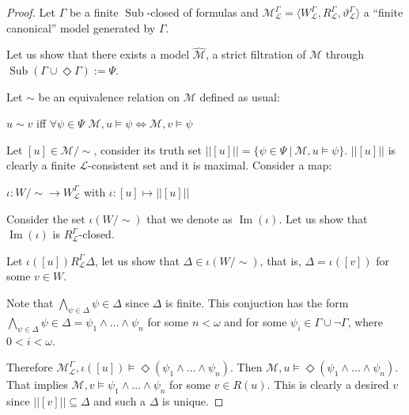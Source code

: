 \documentclass[a4paper]{article}
\theoremstyle{defin}
\theoremstyle{theorem}
\theoremstyle{prop}
\theoremstyle{lemma}
\theoremstyle{fact}
\theoremstyle{ex}
\theoremstyle{col}
\begin{document}
\begin{proof}
Let $\Gamma$ be a finite $\operatorname{Sub}$-closed of formulas and $\mathcal{M}_{\mathcal{L}}^{\Gamma} = \langle W_{\mathcal{L}}^{\Gamma}, R_{\mathcal{L}}^{\Gamma}, \vartheta_{\mathcal{L}}^{\Gamma} \rangle$ a ``finite canonical'' model generated by $\Gamma$.

Let us show that there exists a model $\widehat{\mathcal{M}}$, a strict filtration of $\mathcal{M}$ through $\operatorname{Sub}(\Gamma \cup \Diamond \Gamma) := \Psi$.

Let $\sim$ be an equivalence relation on $\mathcal{M}$ defined as usual:

    \begin{center}
      $u \sim v$ iff $\forall \psi \in \Psi$
      $\mathcal{M}, u \models \psi \Leftrightarrow \mathcal{M}, v \models \psi$
    \end{center}

    Let $[u] \in \mathcal{M}/\sim$, consider its truth set $||[u]|| = \{ \psi \in \Psi \: | \: \mathcal{M}, u \models \psi \}$.
    $||[u]||$ is clearly a finite $\mathcal{L}$-consistent set and it is maximal.
    Consider a map:
    \begin{center}
    $\iota : W/\sim \to W_{\mathcal{L}}^{\Gamma}$ with $\iota : [u] \mapsto ||[u]||$
    \end{center}

    Consider the set $\iota(W/\sim)$ that we denote as $\operatorname{Im}(\iota)$. Let us show that $\operatorname{Im}(\iota)$ is $R_{\mathcal{L}}^{\Gamma}$-closed.

    Let $\iota([u]) R_{\mathcal{L}}^{\Gamma} \Delta$, let us show that $\Delta \in \iota(W/\sim)$, that is, $\Delta = \iota([v])$ for some $v \in W$.

    Note that $\bigwedge \limits_{\psi \in \Delta} \psi \in \Delta$ since $\Delta$ is finite.
    This conjuction has the form $\bigwedge \limits_{\psi \in \Delta} \psi \in \Delta = \psi_1 \land \dots \land \psi_n$ for some $n < \omega$ and for some $\psi_i \in \Gamma \cup \neg \Gamma$, where $0 < i < \omega$.

    Therefore $\mathcal{M}^{\Gamma}_{\mathcal{L}}, \iota([u]) \models \Diamond (\psi_1 \land \dots \land \psi_n)$.
    Then $\mathcal{M}, u \models \Diamond (\psi_1 \land \dots \land \psi_n)$. That implies $\mathcal{M}, v \models \psi_1 \land \dots \land \psi_n$ for some $v \in R(u)$.
    This is clearly a desired $v$ since $||[v]|| \subseteq \Delta$ and such a $\Delta$ is unique.


\end{proof}
\end{document}
